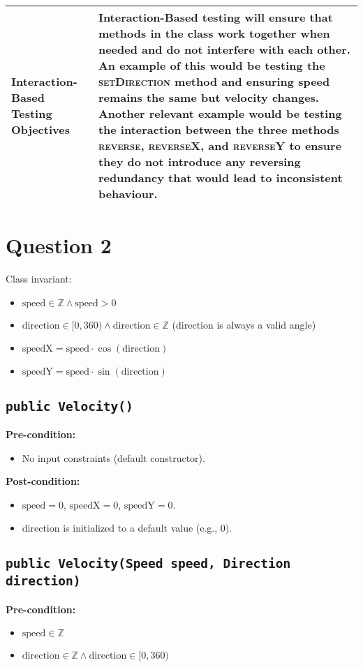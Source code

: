 \documentclass{article}
\begin{document}
\begin{table}[h]
\begin{tabularx}{\textwidth}{ |X|X| }
        \hline
        \textbf{Interaction-Based Testing Objectives} & Interaction-Based testing will ensure that methods in the class work together when needed and do not interfere with each other. An example of this would be testing the \textsc{setDirection} method and ensuring speed remains the same but velocity changes. Another relevant example would be testing the interaction between the three methods \textsc{reverse}, \textsc{reverseX}, and \textsc{reverseY} to ensure they do not introduce any reversing redundancy that would lead to inconsistent behaviour. \\ 
        \hline
    \end{tabularx}
\end{table}

\section*{Question 2}

Class invariant:
\begin{itemize}
    \item \( \text{speed} \in \mathbb{Z}  \wedge  \text{speed} > 0 \)
    \item \( \text{direction} \in [0,360) \wedge \text{direction} \in \mathbb{Z} \) (direction is always a valid angle)
    \item \( \text{speedX} = \text{speed} \cdot \cos(\text{direction}) \)
    \item \( \text{speedY} = \text{speed} \cdot \sin(\text{direction}) \)
\end{itemize}


\subsection*{\texttt{public Velocity()}}
\textbf{Pre-condition:}
\begin{itemize}
    \item No input constraints (default constructor).
\end{itemize}

\textbf{Post-condition:}
\begin{itemize}
    \item \( \text{speed} = 0 \), \( \text{speedX} = 0 \), \( \text{speedY} = 0 \).
    \item \( \text{direction} \) is initialized to a default value (e.g., 0).
\end{itemize}


\subsection*{\texttt{public Velocity(Speed speed, Direction direction)}}
\textbf{Pre-condition:}
\begin{itemize}
    \item \( \text{speed} \in \mathbb{Z} \)
    \item \( \text{direction} \in \mathbb{Z} \wedge \text{direction} \in [0,360) \)
\end{itemize}
\end{document}
